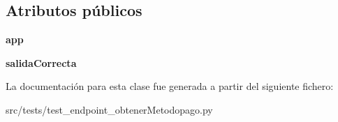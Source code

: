 \subsection*{Atributos públicos}
\begin{DoxyCompactItemize}
\item 
\hypertarget{classsrc_1_1tests_1_1test__endpoint__obtener_metodopago_1_1_test_endpoint_obtener_metodopago_a03bfcc1426af80e3a9708c8d635fc7e6}{{\bfseries app}}\label{classsrc_1_1tests_1_1test__endpoint__obtener_metodopago_1_1_test_endpoint_obtener_metodopago_a03bfcc1426af80e3a9708c8d635fc7e6}

\item 
\hypertarget{classsrc_1_1tests_1_1test__endpoint__obtener_metodopago_1_1_test_endpoint_obtener_metodopago_a6861fb194e4ae489327014d73f417328}{{\bfseries salida\-Correcta}}\label{classsrc_1_1tests_1_1test__endpoint__obtener_metodopago_1_1_test_endpoint_obtener_metodopago_a6861fb194e4ae489327014d73f417328}

\end{DoxyCompactItemize}


La documentación para esta clase fue generada a partir del siguiente fichero\-:\begin{DoxyCompactItemize}
\item 
src/tests/test\-\_\-endpoint\-\_\-obtener\-Metodopago.\-py\end{DoxyCompactItemize}
